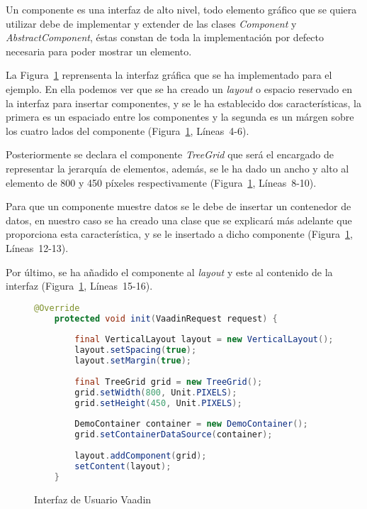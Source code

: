 Un componente es una interfaz de alto nivel, todo elemento gráfico que se quiera utilizar debe de implementar y extender de las clases \emph{Component}\cite{componentVaadin} y \emph{AbstractComponent}\cite{abstractComponentVaadin}, éstas constan de toda la implementación por defecto necesaria para poder mostrar un elemento.

La Figura~\ref{fig:uiVaadin} reprensenta la interfaz gráfica que se ha implementado para el ejemplo. En ella podemos ver que se ha creado un \emph{layout} o espacio reservado en la interfaz para insertar componentes, y se le ha establecido dos características, la primera es un espaciado entre los componentes y la segunda es un márgen sobre los cuatro lados del componente (Figura~\ref{fig:uiVaadin}, Líneas~4-6).

Posteriormente se declara el componente \emph{TreeGrid} que será el encargado de representar la jerarquía de elementos, además, se le ha dado un ancho y alto al elemento de 800 y 450 píxeles respectivamente (Figura~\ref{fig:uiVaadin}, Líneas~8-10).

Para que un componente muestre datos se le debe de insertar un contenedor de datos, en nuestro caso se ha creado una clase que se explicará más adelante que proporciona esta característica, y se le insertado a dicho componente (Figura~\ref{fig:uiVaadin}, Líneas~12-13).

Por último, se ha añadido el componente al \emph{layout} y este al contenido de la interfaz (Figura~\ref{fig:uiVaadin}, Líneas~15-16).

\begin{figure}[!tb]
	\centering
	\begin{lstlisting}[language=Java]
	@Override
	protected void init(VaadinRequest request) {
	
		final VerticalLayout layout = new VerticalLayout();
		layout.setSpacing(true);
		layout.setMargin(true);
		
		final TreeGrid grid = new TreeGrid();
		grid.setWidth(800, Unit.PIXELS);
		grid.setHeight(450, Unit.PIXELS);
		
		DemoContainer container = new DemoContainer();
		grid.setContainerDataSource(container);
		
		layout.addComponent(grid);
		setContent(layout);
	}\end{lstlisting}
	\caption{Interfaz de Usuario Vaadin}
	\label{fig:uiVaadin}
\end{figure}

